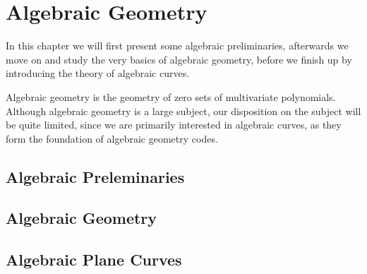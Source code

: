 \chapter{Algebraic Geometry}\label{chap:geom}
In this chapter we will first present some algebraic preliminaries, afterwards we move on and study the very basics of algebraic geometry, before we finish up by introducing the theory of algebraic curves.

Algebraic geometry is the geometry of zero sets of multivariate polynomials. Although algebraic geometry is a large subject, our disposition on the subject will be quite limited, since we are primarily interested in algebraic curves, as they form the foundation of algebraic geometry codes.

\section{Algebraic Preleminaries}\label{sec:alg_preleminaries}




\section{Algebraic Geometry}\label{sec:algebraic_geometry}






\section{Algebraic Plane Curves}\label{sec:algbraic_curves}

%


